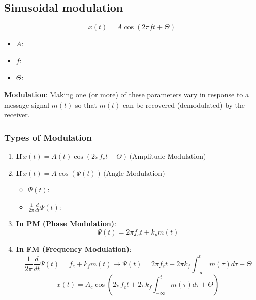 \subsection{Sinusoidal modulation}
\begin{definition}
    \begin{equation*}
        x(t) = A \cos(2 \pi f t + \Theta)
    \end{equation*}

\begin{itemize}
    \item $A$: 
    \item $f$: 
    \item $\Theta$: 
\end{itemize}
\vspace{1em}

\textbf{Modulation}: Making one (or more) of these parameters vary in response to a message signal $m(t)$ so that $m(t)$ can be recovered (demodulated) by the receiver.
\end{definition}

\subsubsection{Types of Modulation}
\begin{definition}
    \begin{enumerate}
        \item $\textbf{If} \, x(t) = A(t) \cos(2 \pi f_c t + \Theta) \, \text{(Amplitude Modulation)}$
        \item $\textbf{If} \, x(t) = A \cos(\Psi(t)) \, \text{(Angle Modulation)}$

        \begin{itemize}
            \item $\Psi(t)$: 
            \item \(\frac{1}{2\pi} \frac{d}{dt} \Psi(t)\): 
        \end{itemize}

        \item \textbf{In PM (Phase Modulation)}:
        \[
        \Psi(t) = 2 \pi f_c t + k_{p} m(t)
        \]

    \item \textbf{In FM (Frequency Modulation)}:
        \[
        \frac{1}{2\pi} \frac{d}{dt} \Psi(t) = f_c + k_f m(t) \rightarrow \Psi(t)=2 \pi f_c t + 2 \pi k_f \int_{-\infty}^{t} m(\tau) d\tau + \Theta
        \]
        \[
        x(t) = A_c \cos\left(2 \pi f_c t + 2 \pi k_f \int_{-\infty}^{t} m(\tau) d\tau + \Theta\right)
        \]

    \end{enumerate}


\end{definition}

